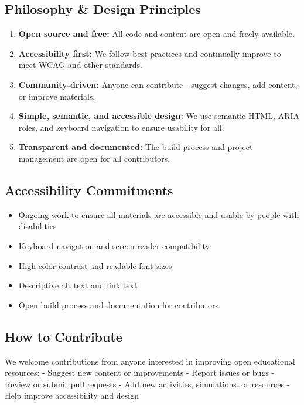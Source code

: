\subsection{Philosophy \& Design
Principles}\label{philosophy-design-principles}

\begin{enumerate}
\def\labelenumi{\arabic{enumi}.}
\tightlist
\item
  \textbf{Open source and free:} All code and content are open and
  freely available.
\item
  \textbf{Accessibility first:} We follow best practices and continually
  improve to meet WCAG and other standards.
\item
  \textbf{Community-driven:} Anyone can contribute---suggest changes,
  add content, or improve materials.
\item
  \textbf{Simple, semantic, and accessible design:} We use semantic
  HTML, ARIA roles, and keyboard navigation to ensure usability for all.
\item
  \textbf{Transparent and documented:} The build process and project
  management are open for all contributors.
\end{enumerate}

\subsection{Accessibility Commitments}\label{accessibility-commitments}

\begin{itemize}
\tightlist
\item
  Ongoing work to ensure all materials are accessible and usable by
  people with disabilities
\item
  Keyboard navigation and screen reader compatibility
\item
  High color contrast and readable font sizes
\item
  Descriptive alt text and link text
\item
  Open build process and documentation for contributors
\end{itemize}

\subsection{How to Contribute}\label{how-to-contribute}

We welcome contributions from anyone interested in improving open
educational resources: - Suggest new content or improvements - Report
issues or bugs - Review or submit pull requests - Add new activities,
simulations, or resources - Help improve accessibility and design

